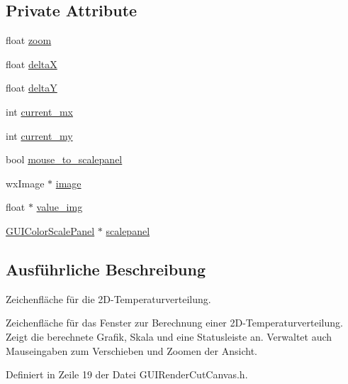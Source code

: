 \subsection*{Private Attribute}
\begin{DoxyCompactItemize}
\item 
float \hyperlink{classGUIRenderCutCanvas_ac680bbbc673a6b336dcfc812c70a0779}{zoom}
\item 
float \hyperlink{classGUIRenderCutCanvas_a28357900ca23a3d3519af015ed6333ba}{delta\-X}
\item 
float \hyperlink{classGUIRenderCutCanvas_a17b630c38009368a99e37b9f0eab3deb}{delta\-Y}
\item 
int \hyperlink{classGUIRenderCutCanvas_af6d75eea1254d03ed36a07a865bf48c1}{current\-\_\-mx}
\item 
int \hyperlink{classGUIRenderCutCanvas_a349deb05f26285eaf8207cbe45bf6603}{current\-\_\-my}
\item 
bool \hyperlink{classGUIRenderCutCanvas_a67247191a5442c586d32c9ef6cb1df2e}{mouse\-\_\-to\-\_\-scalepanel}
\item 
wx\-Image $\ast$ \hyperlink{classGUIRenderCutCanvas_a11ac45e65920dedf0cfbba21865dc2f9}{image}
\item 
float $\ast$ \hyperlink{classGUIRenderCutCanvas_ad5a1f8cc7bd80e3c5a1fde354f0506b0}{value\-\_\-img}
\item 
\hyperlink{classGUIColorScalePanel}{G\-U\-I\-Color\-Scale\-Panel} $\ast$ \hyperlink{classGUIRenderCutCanvas_a775d88069fbba36582815b477f929632}{scalepanel}
\end{DoxyCompactItemize}


\subsection{Ausführliche Beschreibung}
Zeichenfläche für die 2\-D-\/\-Temperaturverteilung. 

Zeichenfläche für das Fenster zur Berechnung einer 2\-D-\/\-Temperaturverteilung. Zeigt die berechnete Grafik, Skala und eine Statusleiste an. Verwaltet auch Mauseingaben zum Verschieben und Zoomen der Ansicht. 

Definiert in Zeile 19 der Datei G\-U\-I\-Render\-Cut\-Canvas.\-h.



